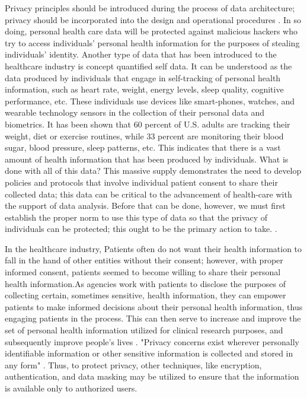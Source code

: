 \documentclass[sigconf]{acmart}
\begin{document}
Privacy principles should be introduced during the process of data architecture; privacy should be incorporated into the design and operational procedures \cite{cavoukian2012privacy}. In so doing, personal health care data will be protected against malicious hackers who try to access individuals' personal health information for the purposes of stealing individuals' identity. Another type of data that has been introduced to the healthcare industry is concept quantified self data. It can be understood as the data produced by individuals that engage in self-tracking of personal health information, such as heart rate, weight, energy levels, sleep quality, cognitive performance, etc. These individuals use devices like smart-phones, watches, and wearable technology sensors in the collection of their personal data and biometrics. It has been shown that 60 percent of U.S. adults are tracking their weight, diet or exercise routines, while 33 percent are monitoring their blood sugar, blood pressure, sleep patterns, etc. This indicates that there is a vast amount of health information that has been produced by individuals. What is done with all of this data? This massive supply demonstrates the need to develop policies and protocols that involve individual patient consent to share their collected data; this data can be critical to the advancement of health-care with the support of data analysis. Before that can be done, however, we must first establish the proper norm to use this type of data so that the privacy of individuals can be protected; this ought to be the primary action to take. \cite{swan2013quantified}.

In the healthcare industry, Patients often do not want their health information to fall in the hand of other entities without their consent; however, with proper informed consent, patients seemed to become willing to share their personal health information.As agencies work with patients to disclose the purposes of collecting certain, sometimes sensitive, health information, they can empower patients to make informed decisions about their personal health information, thus engaging patients in the process. This can then serve to increase and improve the set of personal health information utilized for clinical research purposes, and subsequently improve people's lives \cite{shelton2011electronic}. 
 "Privacy concerns exist wherever personally identifiable information or other sensitive information is collected and stored in any form" \cite{khan2016digital}. Thus, to protect privacy, other techniques, like encryption, authentication, and data masking may be utilized to ensure that the information is available only to authorized users.
\end{document}

